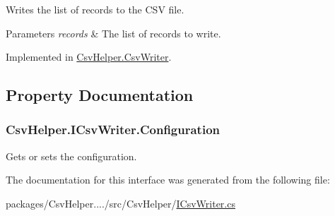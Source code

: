 Writes the list of records to the C\-S\-V file. 


\begin{DoxyParams}{Parameters}
{\em records} & The list of records to write.\\
\hline
\end{DoxyParams}


Implemented in \hyperlink{a00059_ab92f8ddaaa2650eafbd9d16b3813d14e}{Csv\-Helper.\-Csv\-Writer}.



\subsection{Property Documentation}
\hypertarget{a00091_a9eff0fa510dda6664274510dd4b025e5}{
\subsubsection[{Configuration}]{ Csv\-Helper.\-I\-Csv\-Writer.\-Configuration\hspace{0.3cm}{\ttfamily [get]}}}\label{a00091_a9eff0fa510dda6664274510dd4b025e5}


Gets or sets the configuration. 



The documentation for this interface was generated from the following file\-:\begin{DoxyCompactItemize}
\item 
packages/\-Csv\-Helper..../src/\-Csv\-Helper/\hyperlink{a00210}{I\-Csv\-Writer.\-cs}\end{DoxyCompactItemize}
